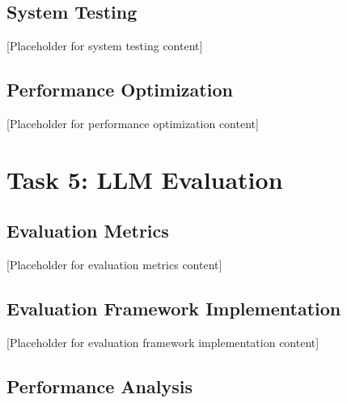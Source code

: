 \documentclass[12pt,a4paper]{article}
\begin{document}
\subsection{System Testing}


[Placeholder for system testing content]

\subsection{Performance Optimization}


[Placeholder for performance optimization content]

\section{Task 5: LLM Evaluation}


\subsection{Evaluation Metrics}


[Placeholder for evaluation metrics content]

\subsection{Evaluation Framework Implementation}


[Placeholder for evaluation framework implementation content]

\subsection{Performance Analysis}
\end{document}
